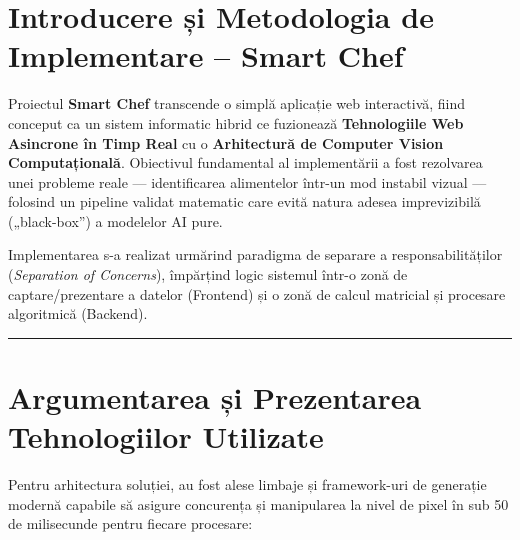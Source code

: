 \documentclass[12pt,a4paper]{article}
\begin{document}
\justifying

\section{Introducere și Metodologia de Implementare – Smart Chef}

Proiectul \textbf{Smart Chef} transcende o simplă aplicație web interactivă, fiind conceput ca un sistem informatic hibrid ce fuzionează \textbf{Tehnologiile Web Asincrone în Timp Real} cu o \textbf{Arhitectură de Computer Vision Computațională}. Obiectivul fundamental al implementării a fost rezolvarea unei probleme reale — identificarea alimentelor într-un mod instabil vizual — folosind un pipeline validat matematic care evită natura adesea imprevizibilă („black-box”) a modelelor AI pure.

Implementarea s-a realizat urmărind paradigma de separare a responsabilităților (\textit{Separation of Concerns}), împărțind logic sistemul într-o zonă de captare/prezentare a datelor (Frontend) și o zonă de calcul matricial și procesare algoritmică (Backend).

\vspace{0.5cm}
\hrule
\vspace{0.5cm}

\section{Argumentarea și Prezentarea Tehnologiilor Utilizate}

Pentru arhitectura soluției, au fost alese limbaje și framework-uri de generație modernă capabile să asigure concurența și manipularea la nivel de pixel în sub 50 de milisecunde pentru fiecare procesare:
\end{document}
